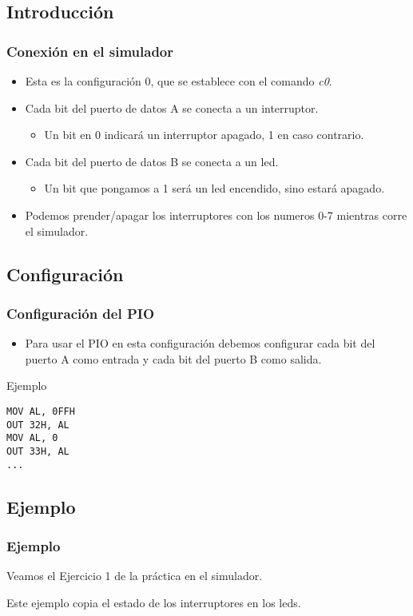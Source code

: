 \documentclass{beamer}
\begin{document}
\subsection{Introducción}
\begin{frame}
\frametitle{Conexión en el simulador}
\begin{itemize}
  \item Esta es la configuración 0, que se establece con el comando \emph{c0}.
  \item Cada bit del puerto de datos A se conecta a un interruptor.
  \begin{itemize}
      \item Un bit en 0 indicará un interruptor apagado, 1 en caso contrario.
\end{itemize}
  \item Cada bit del puerto de datos B se conecta a un led.
\begin{itemize}
      \item Un bit que pongamos a 1 será un led encendido, sino estará apagado.
\end{itemize}
  \item Podemos prender/apagar los interruptores con los numeros 0-7 mientras corre el simulador.
\end{itemize}
\end{frame}

\subsection{Configuración}
\begin{frame}[fragile]
\frametitle{Configuración del PIO}
\begin{itemize}
  \item Para usar el PIO en esta configuración debemos configurar cada bit del puerto A como entrada y cada bit del puerto B como salida.
\end{itemize}

\begin{block}{Ejemplo}
\begin{verbatim}
MOV AL, 0FFH
OUT 32H, AL
MOV AL, 0
OUT 33H, AL
...
\end{verbatim}

\end{block}

\end{frame}

\subsection{Ejemplo}
\begin{frame}
\frametitle{Ejemplo}
Veamos el Ejercicio 1 de la práctica en el simulador.

Este ejemplo copia el estado de los interruptores en los leds.
\end{frame}
\end{document}
